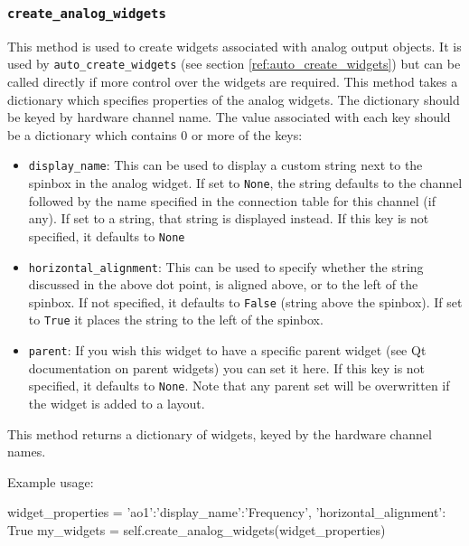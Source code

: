 \documentclass[12pt]{article}
\begin{document}
\subsubsection{\texttt{create\_analog\_widgets}}\label{ref:create_analog_widgets}
This method is used to create widgets associated with analog output objects.
It is used by \texttt{auto\_create\_widgets} (see section \ref{ref:auto_create_widgets}) but can be called directly if more control over the widgets are required.
This method takes a dictionary which specifies properties of the analog widgets.
The dictionary should be keyed by hardware channel name.
The value associated with each key should be a dictionary which contains 0 or more of the keys:

\begin{itemize}
	\item \texttt{display\_name}: This can be used to display a custom string next to the spinbox in the analog widget. 
	If set to \texttt{None}, the string defaults to the channel followed by the name specified in the connection table for this channel (if any). 
	If set to a string, that string is displayed instead.
	If this key is not specified, it defaults to \texttt{None}
	
	\item \texttt{horizontal\_alignment}: This can be used to specify whether the string discussed in the above dot point, is aligned above, or to the left of the spinbox.
	If not specified, it defaults to \texttt{False} (string above the spinbox).
	If set to \texttt{True} it places the string to the left of the spinbox.
	
	\item \texttt{parent}: If you wish this widget to have a specific parent widget (see Qt documentation on parent widgets) you can set it here.
	If this key is not specified, it defaults to \texttt{None}.
	Note that any parent set will be overwritten if the widget is added to a layout.
\end{itemize}

This method returns a dictionary of widgets, keyed by the hardware channel names.

Example usage:
\begin{python}
widget_properties = {'ao1':{'display_name':'Frequency',
                            'horizontal_alignment': True
                           }
                    }
my_widgets = self.create_analog_widgets(widget_properties)
\end{python}
\end{document}
